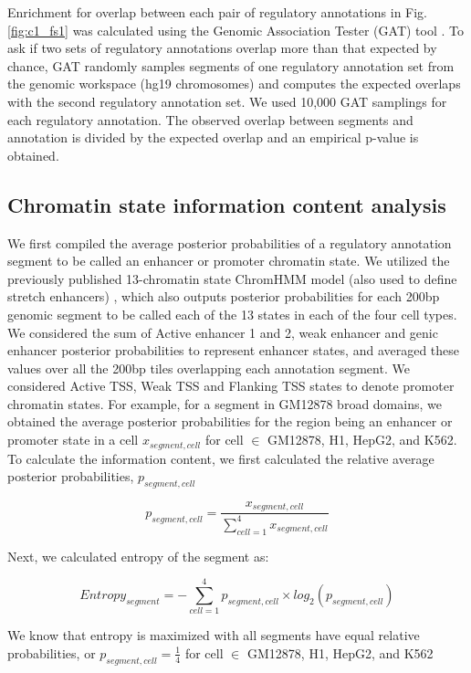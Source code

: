 Enrichment for overlap between each pair of regulatory annotations in Fig. \ref{fig:c1_fs1} was calculated using the Genomic Association Tester (GAT) tool \cite{hegerGATSimulationFramework2013}. To ask if two sets of regulatory annotations overlap more than that expected by chance, GAT randomly samples segments of one regulatory annotation set from the genomic workspace (hg19 chromosomes) and computes the expected overlaps with the second regulatory annotation set. We used 10,000 GAT samplings for each regulatory annotation. The observed overlap between segments and annotation is divided by the expected overlap and an empirical p-value is obtained.

\subsection{Chromatin state information content analysis}
We first compiled the average posterior probabilities of a regulatory annotation segment to be called an enhancer or promoter chromatin state. We utilized the previously published 13-chromatin state ChromHMM model (also used to define stretch enhancers) \cite{varshneyGeneticRegulatorySignatures2017}, which also outputs posterior probabilities for each 200bp genomic segment to be called each of the 13 states in each of the four cell types. We considered the sum of Active enhancer 1 and 2, weak enhancer and genic enhancer posterior probabilities to represent enhancer states, and averaged these values over all the 200bp tiles overlapping each annotation segment. We considered Active TSS, Weak TSS and Flanking TSS states to denote promoter chromatin states. For example, for a segment in GM12878 broad domains, we obtained the average posterior probabilities for the region being an enhancer or promoter state in a cell \(x_{segment, cell}\) for cell \( \in \) {GM12878, H1, HepG2, and K562}. To calculate the information content, we first calculated the relative average posterior probabilities, \(p_{segment, cell}\)

\[ p_{segment, cell} = \frac{x_{segment, cell}} { \sum_{cell=1}^{4}x_{segment, cell}} \]

Next, we calculated entropy of the segment as:

\[ Entropy_{segment}= -\sum_{cell=1}^{4}p_{segment, cell} \times log_2(p_{segment, cell}) \]

We know that entropy is maximized with all segments have equal relative probabilities, or \( p_{segment, cell} = \frac{1}{4} \) for cell \( \in \) {GM12878, H1, HepG2, and K562}

